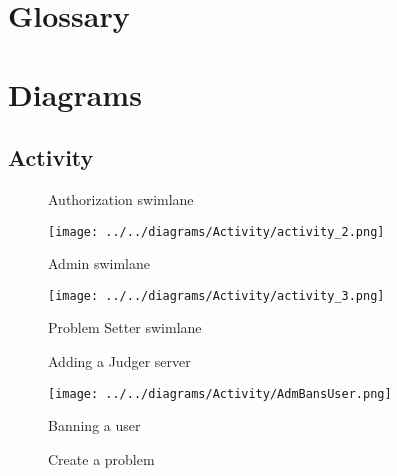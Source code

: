 \appendix
\section{Glossary}

\pagebreak

\vspace*{\fill}
\section{Diagrams}
\vspace*{\fill}
\pagebreak

\vspace*{\fill}
\subsection*{Activity}
\vspace*{\fill}
\pagebreak

\begin{figure}[H]
    \centering
    \caption{Authorization swimlane}
\end{figure}
\pagebreak

\begin{figure}[H]
    \centering
    \texttt{[image: ../../diagrams/Activity/activity\_2.png]}
    \caption{Admin swimlane}
\end{figure}
\pagebreak

\begin{figure}[H]
    \centering
    \texttt{[image: ../../diagrams/Activity/activity\_3.png]}
    \caption{Problem Setter swimlane}
\end{figure}
\pagebreak

\begin{figure}[H]
    \centering
    \caption{Adding a Judger server}
\end{figure}
\pagebreak

\begin{figure}[H]
    \centering
    \texttt{[image: ../../diagrams/Activity/AdmBansUser.png]}
    \caption{Banning a user}
\end{figure}
\pagebreak

\begin{figure}[H]
    \centering
    \caption{Create a problem}
\end{figure}
\pagebreak

